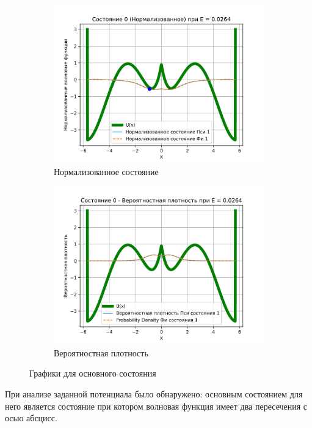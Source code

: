 \documentclass[a4paper,12pt]{article}
\begin{document}
\begin{figure}[H]
    \centering
    \begin{subfigure}{0.45\textwidth}
        \centering
        \includegraphics[width=0.9\linewidth]{Condition_0_(normalized)}
        \caption{Нормализованное состояние}
        \label{fig:norm0}
    \end{subfigure}%
    \begin{subfigure}{0.45\textwidth}
        \centering
        \includegraphics[width=0.9\linewidth]{Condition_0_(Probability_density)}
        \caption{Вероятностная плотность}
        \label{fig:probDens0}
    \end{subfigure}%
\caption{Графики для основного состояния}
\end{figure}
\label{fig:cond0}

При анализе заданной потенциала было обнаружено: основным состоянием для него является состояние при котором волновая функция имеет два пересечения с осью абсцисс.
\end{document}
